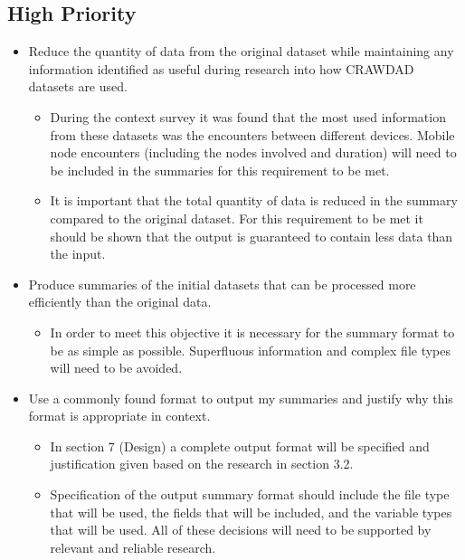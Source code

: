 \subsection{High Priority}
\begin{itemize}
    \item Reduce the quantity of data from the original dataset while maintaining any information identified as useful during research into how CRAWDAD datasets are used.
    \begin{itemize}
        \item During the context survey it was found that the most used information from these datasets was the encounters between different devices. Mobile node encounters (including the nodes involved and duration) will need to be included in the summaries for this requirement to be met. 
        \item It is important that the total quantity of data is reduced in the summary compared to the original dataset. For this requirement to be met it should be shown that the output is guaranteed to contain less data than the input.
    \end{itemize}
    \item Produce summaries of the initial datasets that can be processed more efficiently than the original data.
    \begin{itemize}
        \item In order to meet this objective it is necessary for the summary format to be as simple as possible. Superfluous information and complex file types will need to be avoided. 
    \end{itemize}
    \item Use a commonly found format to output my summaries and justify why this format is appropriate in context.
    \begin{itemize}
        \item In section 7 (Design) a complete output format will be specified and justification given based on the research in section 3.2.
        \item Specification of the output summary format should include the file type that will be used, the fields that will be included, and the variable types that will be used. All of these decisions will need to be supported by relevant and reliable research.
    \end{itemize}
\end{itemize}

